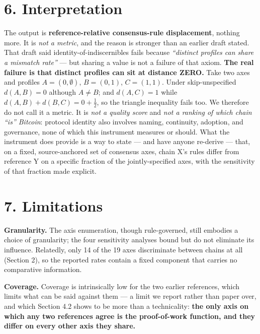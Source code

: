 \documentclass[
]{article}
\newcounter{none} %
\begin{document}
\section{6. Interpretation}\label{interpretation}

The output is \textbf{reference-relative consensus-rule displacement},
nothing more. It is \emph{not a metric}, and the reason is stronger than
an earlier draft stated. That draft said identity-of-indiscernibles
fails because \emph{``distinct profiles can share a mismatch rate''} ---
but sharing a value is not a failure of that axiom. \textbf{The real
failure is that distinct profiles can sit at distance ZERO.} Take two
axes and profiles \(A=(0,\emptyset)\), \(B=(0,1)\), \(C=(1,1)\). Under
skip-unspecified \(d(A,B)=0\) although \(A \neq B\); and \(d(A,C)=1\)
while \(d(A,B)+d(B,C)=0+\tfrac{1}{2}\), so the triangle inequality fails
too. We therefore do not call it a metric. It is \emph{not a quality
score} and \emph{not a ranking of which chain ``is'' Bitcoin}: protocol
identity also involves naming, continuity, adoption, and governance,
none of which this instrument measures or should. What the instrument
does provide is a way to state --- and have anyone re-derive --- that,
on a fixed, source-anchored set of consensus axes, chain X's rules
differ from reference Y on a specific fraction of the jointly-specified
axes, with the sensitivity of that fraction made explicit.

\section{7. Limitations}\label{limitations}

\textbf{Granularity.} The axis enumeration, though rule-governed, still
embodies a choice of granularity; the four sensitivity analyses bound
but do not eliminate its influence. Relatedly, only 14 of the 19 axes
discriminate between chains at all (Section 2), so the reported rates
contain a fixed component that carries no comparative information.

\textbf{Coverage.} Coverage is intrinsically low for the two earlier
references, which limits what can be said against them --- a limit we
report rather than paper over, and which Section 4.2 shows to be more
than a technicality: \textbf{the only axis on which any two references
agree is the proof-of-work function, and they differ on every other axis
they share.}
\end{document}
